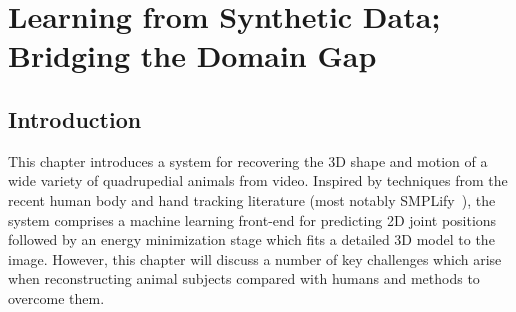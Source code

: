 

\chapter{Learning from Synthetic Data; Bridging the Domain Gap}\label{chap:cgas}

\def\figref#1{Fig.~\ref{fig:#1}}

\ifpdf
    \graphicspath{{Chapter4/Figs/Raster/}{Chapter4/Figs/PDF/}{Chapter4/Figs/}}
\else
    \graphicspath{{Chapter4/Figs/Vector/}{Chapter4/Figs/}}
\fi



\section{Introduction}

    This chapter introduces a system for recovering the 3D shape and motion of a wide variety of quadrupedial animals from video. Inspired by techniques from the recent human body and hand tracking literature (most notably SMPLify~\cite{bogo16keep}), the system comprises a machine learning front-end for predicting 2D joint positions followed by an energy minimization stage which fits a detailed 3D model to the image. However, this chapter will discuss a number of key challenges which arise when reconstructing animal subjects compared with humans and methods to overcome them.

